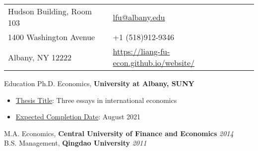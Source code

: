 \documentclass{resume_liang} %
\begin{document}
	
\begin{tabu} to \linewidth {X[l]X[r]}
	Hudson Building, Room 103     &  \href{mailto:lfu@albany.edu}{lfu@albany.edu}  \\
	1400 Washington Avenue        & +1 (518)912-9346\\
	Albany, NY 12222              & \href{https://liang-fu-econ.github.io/website/}{https://liang-fu-econ.github.io/website/}
\end{tabu}
\bigskip \bigskip










\begin{rSection}{Education}
Ph.D. Economics, {\bf University at Albany, SUNY}                     
  \begin{itemize}
  	\item[] \underline{Thesis Title}: Three essays in international economics
  	\item[] \underline{Expected Completion Date}: August 2021
  \end{itemize}
M.A. Economics, {\bf Central University of Finance and Economics}    \hfill {\em 2014} \\
B.S. Management, {\bf Qingdao University}                            \hfill {\em 2011} \\
\end{rSection}
\bigskip \bigskip
\end{document}
